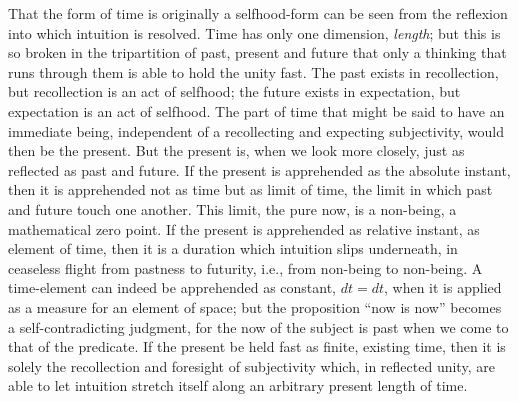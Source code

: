 \documentclass[12pt,a4paper]{book}
\begin{document}
That the form of time is originally a selfhood-form can be seen from the reflexion
into which intuition is resolved. Time has only one dimension, \emph{length}; but
this is so broken in the tripartition of past, present and future that only a
thinking that runs through them is able to hold the unity fast. The past exists in
recollection, but recollection is an act of selfhood; the future exists in
expectation, but expectation is an act of selfhood. The part of time that might be
said to have an immediate being, independent of a recollecting and expecting
subjectivity, would then be the present. But the present is, when we look more
closely, just as reflected as past and future. If the present is apprehended as the
absolute instant, then it is apprehended not as time but as limit of time, the
limit in which past and future touch one another. This limit, the pure now, is a
non-being, a mathematical zero point. If the present is apprehended as relative
instant, as element of time, then it is a duration which intuition slips
underneath, in ceaseless flight from pastness to futurity, i.e., from non-being to
non-being. A time-element can indeed be apprehended as constant, $dt = dt$, when it
is applied as a measure for an element of space; but the proposition ``now is now''
becomes a self-contradicting judgment, for the now of the subject is past when we
come to that of the predicate. If the present be held fast as finite, existing
time, then it is solely the recollection and foresight of subjectivity which, in
reflected unity, are able to let intuition stretch itself along an arbitrary
present length of time.
\end{document}
